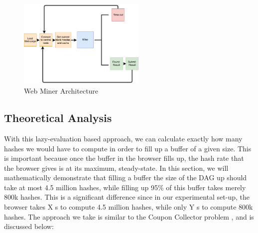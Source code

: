 \documentclass[runningheads]{llncs}
\begin{document}
\begin{figure}[h]
\centering
\includegraphics[width=230px,keepaspectratio]{Hybrid-Miner.pdf}
\caption{\label{fig:hybridArchitecture} Web Miner Architecture}
\end{figure}

\subsection{Theoretical Analysis}
With this lazy-evaluation based approach, we can calculate exactly how many hashes we would have to compute in order to fill up a buffer of a given size. This is important because once the buffer in the browser fills up, the hash rate that the browser gives is at its maximum, steady-state. In this section, we will mathematically demonstrate that filling a buffer the size of the DAG up should take at most 4.5 million hashes, while filling up 95\% of this buffer takes merely 800k hashes. This is a significant difference since in our experimental set-up, the browser takes X s to compute 4.5 million hashes, while only Y s to compute 800k hashes. The approach we take is similar to the Coupon Collector problem \cite{couponCollector}, and is discussed below:
\end{document}
